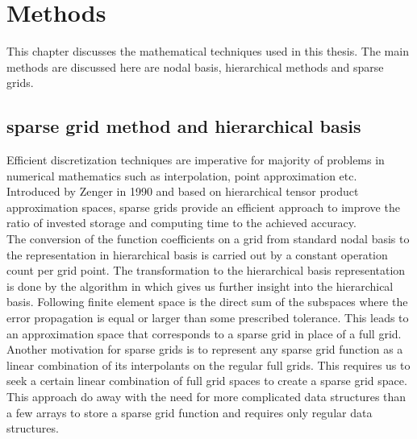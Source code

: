 \chapter{Methods}
\label{chapter:methods}
This chapter discusses the mathematical techniques used in this thesis. The main methods are discussed here are nodal basis, hierarchical methods and sparse grids.

\section{sparse grid method and hierarchical basis}

 Efficient discretization techniques are imperative for majority of problems in numerical mathematics such as interpolation, point approximation etc. Introduced by Zenger in 1990  and based on hierarchical tensor product approximation spaces, sparse grids provide an efficient approach to improve the ratio of invested storage and computing time to the achieved accuracy.\cite{Bungartz1998}\\ %

The conversion of the function coefficients on a grid from standard nodal basis to the representation in hierarchical basis is carried out by a constant operation count per grid point. The transformation to the hierarchical basis representation is done by the algorithm in  \cite{Griebel1992b} which gives us further insight into the hierarchical basis.  Following  \cite{Zenger1990} finite element space is the direct sum of the subspaces where the error propagation is equal or larger than some prescribed tolerance. This leads to an approximation space that corresponds to a sparse grid in place of a full grid. Another motivation for sparse grids is to represent any sparse grid function as a linear combination of its interpolants on the regular full grids. This requires us to seek a certain linear combination of full grid spaces to create a sparse grid space. This approach do away with the need for more complicated data structures than a few arrays to store a sparse grid function and requires only regular data structures.\cite{Griebel1992b} \\

